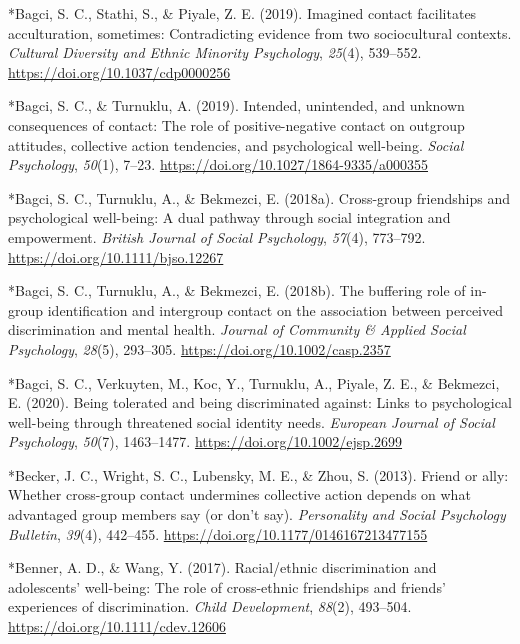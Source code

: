 \documentclass[12pt, letterpaper]{article}
\begin{document}
\leavevmode\hypertarget{ref-423}{}%
*Bagci, S. C., Stathi, S., \& Piyale, Z. E. (2019). Imagined contact
facilitates acculturation, sometimes: Contradicting evidence from two
sociocultural contexts. \emph{Cultural Diversity and Ethnic Minority
Psychology}, \emph{25}(4), 539--552.
\url{https://doi.org/10.1037/cdp0000256}

\leavevmode\hypertarget{ref-322}{}%
*Bagci, S. C., \& Turnuklu, A. (2019). Intended, unintended, and unknown
consequences of contact: The role of positive-negative contact on
outgroup attitudes, collective action tendencies, and psychological
well-being. \emph{Social Psychology}, \emph{50}(1), 7--23.
\url{https://doi.org/10.1027/1864-9335/a000355}

\leavevmode\hypertarget{ref-414}{}%
*Bagci, S. C., Turnuklu, A., \& Bekmezci, E. (2018a). Cross-group
friendships and psychological well-being: A dual pathway through social
integration and empowerment. \emph{British Journal of Social
Psychology}, \emph{57}(4), 773--792.
\url{https://doi.org/10.1111/bjso.12267}

\leavevmode\hypertarget{ref-2257}{}%
*Bagci, S. C., Turnuklu, A., \& Bekmezci, E. (2018b). The buffering role
of in-group identification and intergroup contact on the association
between perceived discrimination and mental health. \emph{Journal of
Community \& Applied Social Psychology}, \emph{28}(5), 293--305.
\url{https://doi.org/10.1002/casp.2357}

\leavevmode\hypertarget{ref-2396}{}%
*Bagci, S. C., Verkuyten, M., Koc, Y., Turnuklu, A., Piyale, Z. E., \&
Bekmezci, E. (2020). Being tolerated and being discriminated against:
Links to psychological well-being through threatened social identity
needs. \emph{European Journal of Social Psychology}, \emph{50}(7),
1463--1477. \url{https://doi.org/10.1002/ejsp.2699}

\leavevmode\hypertarget{ref-2075}{}%
*Becker, J. C., Wright, S. C., Lubensky, M. E., \& Zhou, S. (2013).
Friend or ally: Whether cross-group contact undermines collective action
depends on what advantaged group members say (or don't say).
\emph{Personality and Social Psychology Bulletin}, \emph{39}(4),
442--455. \url{https://doi.org/10.1177/0146167213477155}

\leavevmode\hypertarget{ref-1045}{}%
*Benner, A. D., \& Wang, Y. (2017). Racial/ethnic discrimination and
adolescents' well-being: The role of cross-ethnic friendships and
friends' experiences of discrimination. \emph{Child Development},
\emph{88}(2), 493--504. \url{https://doi.org/10.1111/cdev.12606}
\end{document}
